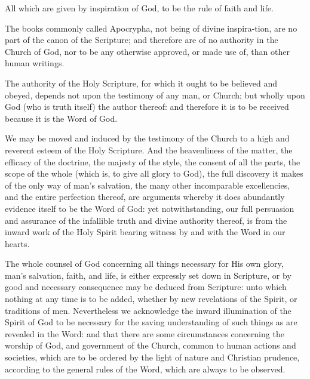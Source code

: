 \begin{outerlst}[left=0pt,labelsep=0pt]
\begin{innerlst}[wide, labelwidth=!, labelindent=0pt, labelsep=4pt]
\par All which are given by inspiration of God, to be the rule of faith and life.   

\item The books commonly called Apocrypha, not being of divine inspira-tion, are no part of the canon of the Scripture; and therefore are of no authority in the Church of God, nor to be any otherwise approved, or made use of, than other human writings.   

\item The authority of the Holy Scripture, for which it ought to be believed and obeyed, depends not upon the testimony of any man, or Church; but wholly upon God (who is truth itself) the author thereof: and therefore it is to be received because it is the Word of God.

\item We may be moved and induced by the testimony of the Church to a high and reverent esteem of the Holy Scripture. And the heavenliness of the matter, the efficacy of the doctrine, the majesty of the style, the consent of all the parts, the scope of the whole (which is, to give all glory to God), the full discovery it makes of the only way of man's salvation, the many other incomparable excellencies, and the entire perfection thereof, are arguments whereby it does abundantly evidence itself to be the Word of God: yet notwithstanding, our full persuasion and assurance of the infallible truth and divine authority thereof, is from the inward work of the Holy Spirit bearing witness by and with the Word in our hearts.    

\item The whole counsel of God concerning all things necessary for His own glory, man's salvation, faith, and life, is either expressly set down in Scripture, or by good and necessary consequence may be deduced from Scripture: unto which nothing at any time is to be added, whether by new revelations of the Spirit, or traditions of men. Nevertheless we acknowledge the inward illumination of the Spirit of God to be necessary for the saving understanding of such things as are revealed in the Word: and that there are some circumstances concerning the worship of God, and government of the Church, common to human actions and societies, which are to be ordered by the light of nature and Christian prudence, according to the general rules of the Word, which are always to be observed.   


\end{innerlst}
\end{outerlst}
